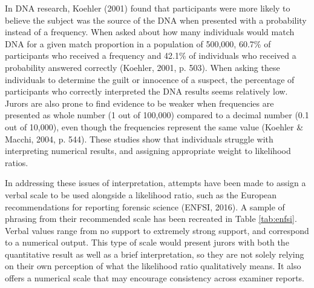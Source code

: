 \documentclass[print]{nuthesis}
\begin{document}
In DNA research, Koehler (2001) found that participants were more likely to believe the subject was the source of the DNA when presented with a probability instead of a frequency.
When asked about how many individuals would match DNA for a given match proportion in a population of 500,000, 60.7\% of participants who received a frequency and 42.1\% of individuals who received a probability answered correctly (Koehler, 2001, p. 503).
When asking these individuals to determine the guilt or innocence of a suspect, the percentage of participants who correctly interpreted the DNA results seems relatively low.
Jurors are also prone to find evidence to be weaker when frequencies are presented as whole number (1 out of 100,000) compared to a decimal number (0.1 out of 10,000), even though the frequencies represent the same value (Koehler \& Macchi, 2004, p. 544).
These studies show that individuals struggle with interpreting numerical results, and assigning appropriate weight to likelihood ratios.

In addressing these issues of interpretation, attempts have been made to assign a verbal scale to be used alongside a likelihood ratio, such as the European recommendations for reporting forensic science  (ENFSI, 2016).
A sample of phrasing from their recommended scale has been recreated in Table \ref{tab:enfsi}.
Verbal values range from no support to extremely strong support, and correspond to a numerical output.
This type of scale would present jurors with both the quantitative result as well as a brief interpretation, so they are not solely relying on their own perception of what the likelihood ratio qualitatively means.
It also offers a numerical scale that may encourage consistency across examiner reports.
\end{document}
